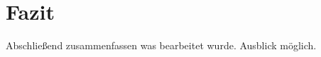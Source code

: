 \chapter{Fazit}
\label{cha:fazit}

Abschließend zusammenfassen was bearbeitet wurde. Ausblick möglich.